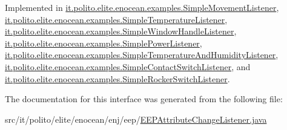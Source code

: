 Implemented in \hyperlink{classit_1_1polito_1_1elite_1_1enocean_1_1examples_1_1_simple_movement_listener_a58979c6da36565e3ce5586b02731abc2}{it.\+polito.\+elite.\+enocean.\+examples.\+Simple\+Movement\+Listener}, \hyperlink{classit_1_1polito_1_1elite_1_1enocean_1_1examples_1_1_simple_temperature_listener_a48101f4ebbdfd8949b0bee0261737ffe}{it.\+polito.\+elite.\+enocean.\+examples.\+Simple\+Temperature\+Listener}, \hyperlink{classit_1_1polito_1_1elite_1_1enocean_1_1examples_1_1_simple_window_handle_listener_a39176a5ebe41a14b797c532232dfb7fe}{it.\+polito.\+elite.\+enocean.\+examples.\+Simple\+Window\+Handle\+Listener}, \hyperlink{classit_1_1polito_1_1elite_1_1enocean_1_1examples_1_1_simple_power_listener_ab479959b53e0206e832d1e5f31da8cc6}{it.\+polito.\+elite.\+enocean.\+examples.\+Simple\+Power\+Listener}, \hyperlink{classit_1_1polito_1_1elite_1_1enocean_1_1examples_1_1_simple_temperature_and_humidity_listener_a8678c45e00f13cd428e12dabc463d853}{it.\+polito.\+elite.\+enocean.\+examples.\+Simple\+Temperature\+And\+Humidity\+Listener}, \hyperlink{classit_1_1polito_1_1elite_1_1enocean_1_1examples_1_1_simple_contact_switch_listener_a232992168bed46ed042de644aa1caf8f}{it.\+polito.\+elite.\+enocean.\+examples.\+Simple\+Contact\+Switch\+Listener}, and \hyperlink{classit_1_1polito_1_1elite_1_1enocean_1_1examples_1_1_simple_rocker_switch_listener_a240a314a6f13130d31c70dac34ad0348}{it.\+polito.\+elite.\+enocean.\+examples.\+Simple\+Rocker\+Switch\+Listener}.



The documentation for this interface was generated from the following file\+:\begin{DoxyCompactItemize}
\item 
src/it/polito/elite/enocean/enj/eep/\hyperlink{_e_e_p_attribute_change_listener_8java}{E\+E\+P\+Attribute\+Change\+Listener.\+java}\end{DoxyCompactItemize}
